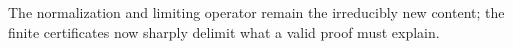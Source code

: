The normalization and limiting operator remain the irreducibly new content; the finite certificates now sharply delimit what a valid proof must explain.